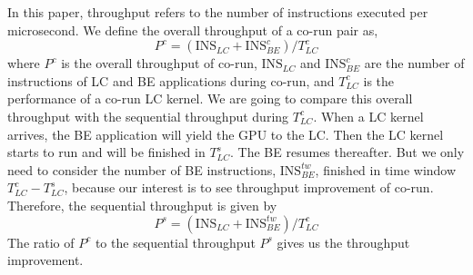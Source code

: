     In this paper, throughput refers to the number of instructions executed per microsecond. We define the overall throughput of a co-run pair as,
    \begin{equation}
    P^c=\left(\text{INS}_{LC} +\text{INS}_{BE}^c\right)/T_{LC}^c
    \end{equation}
    where $P^{c}$ is the overall throughput of co-run, $\text{INS}_{LC}$ and $\text{INS}_{BE}^c$ are the number of instructions of LC and BE applications during co-run, and $T_{LC}^{c}$ is the performance of a co-run LC kernel. %
    We are going to compare this overall throughput with the sequential throughput during $T_{LC}^c$. 
    When a LC kernel arrives, the BE application will yield the GPU to the LC. Then the LC kernel starts to run and will be finished in $T_{LC}^s$. The BE resumes thereafter. But we only need to consider the number of BE instructions, $\text{INS}_{BE}^{tw}$, finished in time window $T_{LC}^c - T_{LC}^s$, because our interest is to see throughput improvement of co-run. Therefore, the sequential throughput is given by
    \begin{equation}
        P^s = \left(\text{INS}_{LC}+\text{INS}_{BE}^{tw}\right)/T_{LC}^c
    \end{equation}
    The ratio of $P^c$ to the sequential throughput $P^s$ gives us the throughput improvement.

